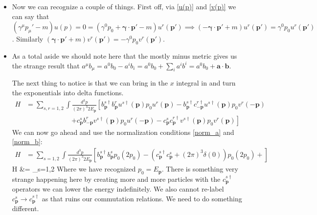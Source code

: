 \documentclass[11pt]{article}
\renewenvironment{flalign}{\vspace{-3mm}\empheq[box=\tcbhighmath]{align}}{\endempheq}
\numberwithin{equation}{section}
\begin{document}
     \begin{itemize}
       \item  Now we can recognize a couple of things. First off, via \ref{u(p)} and \ref{v(p)} we can say that $(\gamma^{\mu}p_{\mu}'-m)u(p)= 0 = (\gamma^{0}p_{0}+\boldsymbol{\gamma}\cdot \textbf{p}' -m)u^{r}(\textbf{p}') \implies  (-\boldsymbol{\gamma}\cdot \textbf{p}' +m)u^{r}(\textbf{p}') = \gamma^{0}p_0u^{r}(\textbf{p}')$. Similarly $(\boldsymbol{\gamma}\cdot \textbf{p}' +m)v^{r}(\textbf{p}') = -\gamma^{0}p_0v^{r}(\textbf{p}')$. 

       \item As a total aside we should note here that the mostly minus metric gives us the strange result that $a^{\mu}b_{\mu} = a^0b_0-a^{i}b_{i} =a^0b_0+\sum_ia^{i}b^{i} =a^0b_0+\textbf{a}\cdot\textbf{b}$.

       The next thing to notice is that we can bring in the $x$ integral in and turn the exponentials into delta functions. 
       \begin{align*}
         H &= \sum_{s,r=1,2}\int \frac{d^3p}{(2\pi)^3 2E_{\textbf{p}}}\left[b^{s \dagger}_{\textbf{p}}b^{r}_{\textbf{p}}u^{s\dagger}(\textbf{p})p_0u^{r}(\textbf{p})-b^{s\dagger}_{\textbf{p}}c^{r\dagger}_{-\textbf{p}}u^{s\dagger}(\textbf{p})p_0v^{r}(-\textbf{p})\right. \\
      &~~~~~~~~~~~~~~~~~~~~~~~~~~~~~~\left.+c^{s}_{\textbf{p}}b^{r}_{-\textbf{p}}v^{s\dagger}(\textbf{p})p_0u^{r}(-\textbf{p})-c^{s}_{\textbf{p}}c^{r\dagger}_{\textbf{p}}v^{s\dagger}(\textbf{p})p_0v^{r}(\textbf{p})\right]
       \end{align*}
       We can now go ahead and use the normalization conditions \ref{norm_a} and \ref{norm_b}: 
       \begin{align*}
          H &= \sum_{s=1,2}\int \frac{d^3p}{(2\pi)^3 2E_{\textbf{p}}}\left[b^{s \dagger}_{\textbf{p}}b^{s}_{\textbf{p}}p_0(2p_0)-(c^{s\dagger}_{\textbf{p}}c^{s}_{\textbf{p}}+(2\pi)^3\delta(0))p_0(2p_0)+\right]
        \end{align*}
        \begin{flalign}
           \implies H  &= \sum_{s=1,2}\int {}
         \end{flalign} 
         Where we have recognized $p_0 = E_{\textbf{p}}$. There is something very strange happening here by creating more and more particles with the $c^{s\dagger}_{\textbf{p}}$ operators we can lower the energy indefinitely. We also cannot re-label $c^{s}_{\textbf{p}}\rightarrow c^{s\dagger}_{\textbf{p}}$ as that ruins our commutation relations. We need to do something different.  
     \end{itemize}
\end{document}
